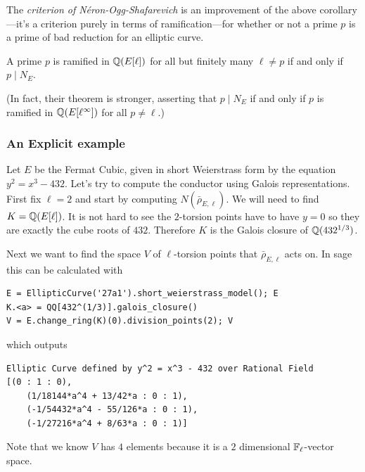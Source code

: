 \documentclass{book}
\begin{document}
The {\em criterion of N\'eron-Ogg-Shafarevich} is an improvement
of the above corollary---it's a criterion purely
in terms of ramification---for whether or not a prime
$p$ is a prime of bad reduction for an elliptic curve.
\begin{theorem}
A prime $p$ is ramified in $\mathbb{Q}(E[\ell])$ for all but
finitely many $\ell\neq p$ if and only if $p\mid N_E$.
\end{theorem}
(In fact, their theorem is stronger, asserting that $p\mid N_E$
if and only if $p$ is ramified in $\mathbb{Q}(E[\ell^\infty])$ for
all $p\neq \ell$.)

\subsubsection{An Explicit example}
Let $E$ be the Fermat Cubic, given in short Weierstrass
form by the equation $y^2 = x^3 - 432$. Let's try to
compute the conductor using Galois representations.
First fix $\ell=2$ and start by computing
$N(\bar{\rho}_{E,\ell})$. We will need to find $K =
\mathbb{Q}(E[\ell])$. It is not hard to see the $2$-torsion points
have to have $y=0$ so they are exactly the cube roots of
$432$. Therefore $K$ is the Galois closure of
$\mathbb{Q}(432^{1/3})$.

Next we want to find the space $V$ of $\ell$-torsion points that $\bar{\rho}_{E,\ell}$ acts on. In sage this can be calculated with
	\begin{lstlisting}
E = EllipticCurve('27a1').short_weierstrass_model(); E
K.<a> = QQ[432^(1/3)].galois_closure()
V = E.change_ring(K)(0).division_points(2); V
	\end{lstlisting}
	which outputs
	\begin{lstlisting}
Elliptic Curve defined by y^2 = x^3 - 432 over Rational Field
[(0 : 1 : 0),
    (1/18144*a^4 + 13/42*a : 0 : 1),
    (-1/54432*a^4 - 55/126*a : 0 : 1),
    (-1/27216*a^4 + 8/63*a : 0 : 1)]
	\end{lstlisting}
	Note that we know $V$ has $4$ elements because it is a $2$ dimensional $\mathbb{F}_\ell$-vector space.
\end{document}

